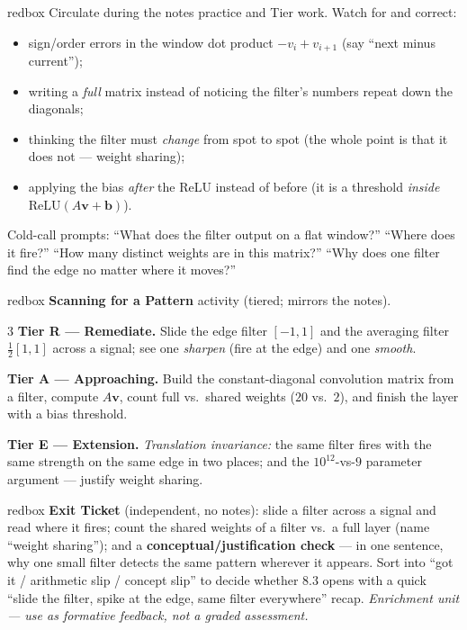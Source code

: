 \documentclass[10pt]{article}
\newcommand{\vv}{\mathbf{v}}
\newcommand{\bb}{\mathbf{b}}
\newcommand{\relu}{\mathrm{ReLU}}
\begin{document}
\begin{skillbox}{redbox}
Circulate during the notes practice and Tier work. Watch for and correct:
\begin{itemize}[leftmargin=1.2em, nosep]
  \item sign/order errors in the window dot product $-v_i+v_{i+1}$ (say ``next minus current'');
  \item writing a \emph{full} matrix instead of noticing the filter's numbers repeat down the diagonals;
  \item thinking the filter must \emph{change} from spot to spot (the whole point is that it does not --- weight sharing);
  \item applying the bias \emph{after} the ReLU instead of before (it is a threshold \emph{inside} $\relu(A\vv+\bb)$).
\end{itemize}
Cold-call prompts: ``What does the filter output on a flat window?'' ``Where does it fire?'' ``How many
distinct weights are in this matrix?'' ``Why does one filter find the edge no matter where it moves?''
\end{skillbox}

\begin{skillbox}{redbox}
\textbf{Scanning for a Pattern} activity (tiered; mirrors the notes).
\begin{multicols}{3}
\textbf{Tier R --- Remediate.} Slide the edge filter $[-1,1]$ and the averaging filter $\tfrac12[1,1]$ across
a signal; see one \emph{sharpen} (fire at the edge) and one \emph{smooth}.

\columnbreak
\textbf{Tier A --- Approaching.} Build the constant-diagonal convolution matrix from a filter, compute $A\vv$,
count full vs.\ shared weights ($20$ vs.\ $2$), and finish the layer with a bias threshold.

\columnbreak
\textbf{Tier E --- Extension.} \emph{Translation invariance:} the same filter fires with the same strength on
the same edge in two places; and the $10^{12}$-vs-$9$ parameter argument --- justify weight sharing.
\end{multicols}
\end{skillbox}

\begin{skillbox}{redbox}
\textbf{Exit Ticket} (independent, no notes): slide a filter across a signal and read where it fires; count
the shared weights of a filter vs.\ a full layer (name ``weight sharing''); and a
\textbf{conceptual/justification check} --- in one sentence, why one small filter detects the same pattern
wherever it appears. Sort into ``got it / arithmetic slip / concept slip'' to decide whether 8.3 opens with a
quick ``slide the filter, spike at the edge, same filter everywhere'' recap. \emph{Enrichment unit --- use as
formative feedback, not a graded assessment.}
\end{skillbox}
\end{document}
